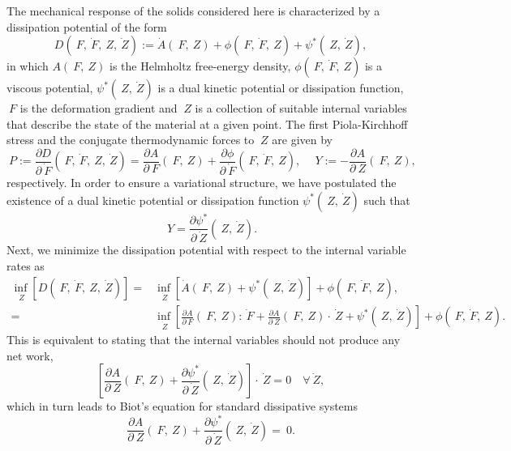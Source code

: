 \documentclass[12pt]{article}
\numberwithin{equation}{section}
\begin{document}
The mechanical response of the solids considered here is characterized
by a dissipation potential of the form
\begin{equation} \label{eq:power-density}
  D(~F, \dot{~F}, ~Z, \dot{~Z})
  :=
  \dot{A}(~F, ~Z)
  +
  \phi(~F, \dot{~F}, ~Z)
  +
  \psi^*(~Z, \dot{~Z}),
\end{equation}
in which $A(~F, ~Z)$ is the Helmholtz free-energy density,
$\phi(~F, \dot{~F}, ~Z)$ is a viscous potential, $\psi^*(~Z,
\dot{~Z})$ is a dual kinetic potential or dissipation function, $~F$
is the deformation gradient and $~Z$ is a collection of suitable
internal variables that describe the state of the material at a given
point. The first Piola-Kirchhoff stress and the conjugate
thermodynamic forces to $~Z$ are given by
\begin{equation} \label{eq:1PKstress-and-Y}
  ~P
  :=
  \frac{\partial D}{\partial \dot{~F}}(~F, \dot{~F}, ~Z, \dot{~Z})
  =
  \frac{\partial A}{\partial ~F}(~F, ~Z)
  +
  \frac{\partial \phi}{\partial \dot{~F}}(~F, \dot{~F}, ~Z),
  \quad
  ~Y := - \frac{\partial A}{\partial ~Z} (~F, ~Z),
\end{equation}
respectively. In order to ensure a variational structure, we have
postulated the existence of a dual kinetic potential or dissipation
function $\psi^*(~Z, \dot{~Z})$ such that
\begin{equation} \label{eq:dual-kinetic-potential}
  ~Y = \frac{\partial \psi^*}{\partial \dot{~Z}} (~Z, \dot{~Z}).
\end{equation}
Next, we minimize the dissipation potential 
with respect to the internal variable rates as
\begin{equation}
  \begin{split}
    \inf_{\dot{~Z}} [ D(~F, \dot{~F}, ~Z, \dot{~Z}) ]
    =
    &
    \inf_{\dot{~Z}}
    \left[
      \dot{A}(~F, ~Z)
      +
      \psi^*(~Z, \dot{~Z})
    \right] +
    \phi(~F, \dot{~F}, ~Z),
    \\
    =
    &
    \inf_{\dot{~Z}}
    \left[
      \frac{\partial A}{\partial ~F}(~F, ~Z) : \dot{~F}
      +
      \frac{\partial A}{\partial ~Z}(~F, ~Z) \cdot \dot{~Z}
      +
      \psi^*(~Z, \dot{~Z})
    \right] +
    \phi(~F, \dot{~F}, ~Z).
  \end{split}
\end{equation}
This is equivalent to stating that the internal variables should not
produce any net work, \ie
\begin{equation} \label{eq:internal-no-work}
  \left[
    \frac{\partial A}{\partial ~Z} (~F, ~Z)
    +
    \frac{\partial \psi^*}{\partial \dot{~Z}} (~Z, \dot{~Z})
  \right]
  \cdot
   \dot{~Z}
  =
  0
  \quad
  \forall \dot{~Z},
\end{equation}
which in turn leads to Biot's equation for standard dissipative systems
\begin{equation} \label{eq:Biots-equation}
  \frac{\partial A}{\partial ~Z} (~F, ~Z)
  +
  \frac{\partial \psi^*}{\partial \dot{~Z}} (~Z, \dot{~Z})
  =
  ~0.
\end{equation}
\end{document}
